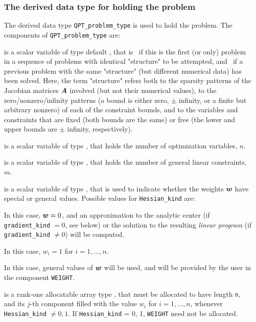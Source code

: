 \documentclass{galahad}
\begin{document}

\subsubsection{The derived data type for holding the problem}\label{typeprob}
The derived data type {\tt QPT\_problem\_type} is used to hold 
the problem. The components of 
{\tt QPT\_problem\_type} 
are:

\begin{description}

 is a scalar variable of type default \logical, 
 that is \true\ if this is the first (or only) problem in a sequence of 
 problems with identical "structure" to be attempted, and \false\ if 
 a previous problem with the same "structure" (but different
 numerical data) has been solved. Here, the term "structure" refers both to 
 the sparsity patterns of the Jacobian matrices ${\bm{A}}$ involved 
 (but not their numerical values), to the zero/nonzero/infinity patterns 
 (a bound is either zero, $\pm$ infinity, or a finite but arbitrary 
 nonzero) of each of the constraint bounds, and to the variables and constraints
 that are fixed (both bounds are the same) or free (the lower and upper
 bounds are $\pm$ infinity, respectively).

 is a scalar variable of type \integer, 
 that holds the number of optimization variables, $n$.  
              
 is a scalar variable of type \integer, 
 that holds the number of general linear constraints, $m$.
              
 is a scalar variable of type \integer, 
that is used to indicate whether the weights ${\bm{w}}$ 
have special or general values. Possible values for {\tt Hessian\_kind} are:
\begin{description}
  In this case, ${\bm{w}} = 0$, and an approximation to the 
  analytic center (if {\tt gradient\_kind} $= 0$, see below) or the
  solution to the resulting {\em linear program}
  (if {\tt gradient\_kind} $\neq 0$) will be computed.

 In this case, $w_{i} = 1$ for $i = 1, \ldots ,n$.

 In this case, general values of ${\bm{w}}$ will be used,
     and will be provided by the user in the component {\tt WEIGHT}.
\end{description}

 is a rank-one allocatable array type \realdp, that 
must be allocated to have length {\tt n}, and its $j$-th component 
filled with the value $w_{i}$ for $i = 1, \ldots ,n$, 
whenever {\tt Hessian\_kind} $\neq 0, 1$.
If {\tt Hessian\_kind} {= 0, 1}, {\tt WEIGHT} need not be allocated.


\end{description}
\end{document}
